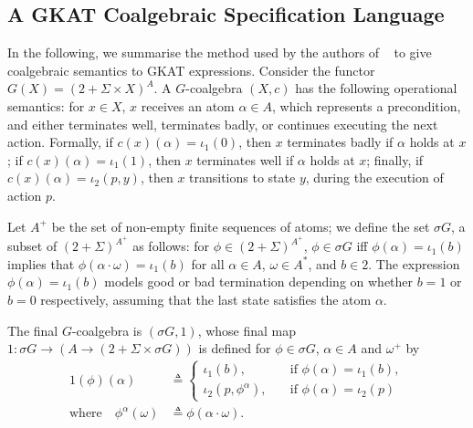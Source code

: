 \subsection{A GKAT Coalgebraic Specification Language}
In the following, we summarise the method used by the authors of ~\cite{GKAT} to give coalgebraic semantics to GKAT expressions. Consider the functor $G(X)=(2+\Sigma\times X)^A$. A $G$-coalgebra $(X,c)$ has the following operational semantics: for $x\in X$, $x$ receives an atom $\alpha\in A$, which represents a precondition, and either terminates well, terminates badly, or continues executing the next action. Formally, if $c(x)(\alpha)=\iota_1(0)$, then $x$ terminates badly if $\alpha$ holds at $x$; if $c(x)(\alpha)=\iota_1(1)$, then $x$ terminates well if $\alpha$ holds at $x$; finally, if $c(x)(\alpha)=\iota_2(p,y)$, then $x$ transitions to state $y$, during the execution of action $p$. 

Let $A^{+}$ be the set of non-empty finite sequences of atoms; we define the set $\sigma G$, a subset of $(2+\Sigma)^{A^{+}}$ as follows: for $\phi \in (2+\Sigma)^{A^{+}}$, $\phi \in \sigma G$ iff $\phi(\alpha)=\iota_1(b)$ implies that $\phi(\alpha\cdot \omega)=\iota_1(b)$ for all $\alpha\in A$, $\omega\in A^*$, and $b\in2$. The expression $\phi(\alpha)=\iota_1(b)$ models good or bad termination depending on whether $b=1$ or $b=0$ respectively, assuming that the last state satisfies the atom $\alpha$. 

The final $G$-coalgebra is $(\sigma G, 1)$, whose final map $1\colon \sigma G\rightarrow (A\rightarrow (2+\Sigma\times\sigma G))$ is defined for $\phi\in \sigma G$, $\alpha\in A$ and $\omega^+$ by
\begin{align}
    1(\phi)(\alpha)&\triangleq
    \begin{cases}
        \iota_1(b),&\quad \text{if $\phi(\alpha)=\iota_1(b)$},\\
        \iota_2(p, \phi^\alpha),&\quad \text{if $\phi(\alpha)=\iota_2(p)$}
    \end{cases}\\
    \text{where}\quad
\phi^\alpha(\omega)&\triangleq \phi(\alpha\cdot \omega).
\end{align}

